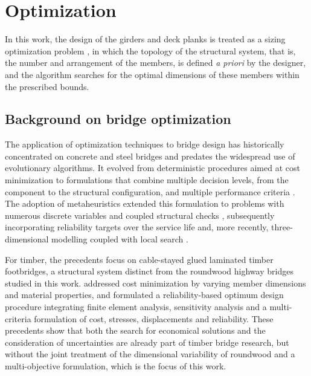 \section{Optimization}\label{sec:otimizacao}

In this work, the design of the girders and deck planks is treated as a sizing optimization problem \parencite{BendsoeSigmund2003}, in which the topology of the structural system, that is, the number and arrangement of the members, is defined \textit{a priori} by the designer, and the algorithm searches for the optimal dimensions of these members within the prescribed bounds.

\subsection{Background on bridge optimization}\label{sec:historico_otimizacao_pontes}

The application of optimization techniques to bridge design has historically concentrated on concrete and steel bridges and predates the widespread use of evolutionary algorithms. It evolved from deterministic procedures aimed at cost minimization \parencite{Aguilar1973, Brar1984} to formulations that combine multiple decision levels, from the component to the structural configuration, and multiple performance criteria \parencite{CohnLounis1994, SimoesNegrao1994}.
The adoption of metaheuristics extended this formulation to problems with numerous discrete variables and coupled structural checks \parencite{Marti2013, GarciaSeguraYepes2016}, subsequently incorporating reliability targets over the service life \parencite{GarciaSegura2017} and, more recently, three-dimensional modelling coupled with local search \parencite{deMoraes2025}.

For timber, the precedents focus on cable-stayed glued laminated timber footbridges, a structural system distinct from the roundwood highway bridges studied in this work. \textcite{Negrao1999} addressed cost minimization by varying member dimensions and material properties, and \textcite{SimoesNegrao2005} formulated a reliability-based optimum design procedure integrating finite element analysis, sensitivity analysis and a multi-criteria formulation of cost, stresses, displacements and reliability.
These precedents show that both the search for economical solutions and the consideration of uncertainties are already part of timber bridge research, but without the joint treatment of the dimensional variability of roundwood and a multi-objective formulation, which is the focus of this work.

